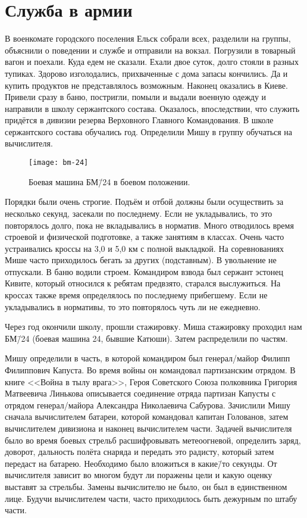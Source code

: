 ﻿\chapter{Служба в армии}
В военкомате городского поселения Ельск собрали всех, разделили на группы, объяснили о поведении и службе и отправили на вокзал. Погрузили в товарный вагон и поехали. Куда едем не сказали. Ехали двое суток, долго стояли в разных тупиках. Здорово изголодались, прихваченные с дома запасы кончились. Да и купить продуктов не представлялось возможным. Наконец оказались в Киеве. Привели сразу в баню, постригли, помыли и выдали военную одежду и направили в школу сержантского состава. Оказалось, впоследствии, что служить придётся в дивизии резерва Верховного Главного Командования. В школе сержантского состава обучались год. Определили Мишу в группу обучаться на вычислителя.

\begin{wrapfigure}{O}{.4\textwidth}
\centering
\texttt{[image: bm-24]}
\caption[Боевая машина БМ\=/24 в боевом положении.]{Боевая машина БМ\=/24 в боевом положении\footnotemark.}
\label{fig:bm-24}
\end{wrapfigure}

Порядки были очень строгие. Подъём и отбой должны были осуществить за несколько секунд, засекали по последнему. Если не укладывались, то это повторялось долго, пока не вкладывались в норматив. Много отводилось время строевой и физической подготовке, а также занятиям в классах. Очень часто устраивались кроссы на 3,0 и 5,0 км с полной выкладкой. На соревнованиях Мише часто приходилось бегать за других (подставным). В увольнение не отпускали. В баню водили строем. Командиром взвода был сержант эстонец Кивите, который относился к ребятам предвзято, старался выслужиться. На кроссах также время определялось по последнему прибегшему. Если не укладывались в нормативы, то это повторялось чуть ли не ежедневно. 

Через год окончили школу, прошли стажировку. Миша стажировку проходил нам БМ\=/24 (боевая машина 24, бывшие Катюши). Затем распределили по частям. 

Мишу определили в часть, в которой командиром был генерал\-/майор Филипп Филиппович Капуста. Во время войны он командовал партизанским отрядом. В книге <<Война в тылу врага>>, Героя Советского Союза полковника Григория Матвеевича Линькова описывается соединение отряда партизан Капусты с отрядом генерал\-/майора Александра Николаевича Сабурова. Зачислили Мишу сначала вычислителем батареи, которой командовал капитан Голованов, затем вычислителем дивизиона и наконец вычислителем части. Задачей вычислителя было во время боевых стрельб расшифровывать метеоогневой, определить заряд, доворот, дальность полёта снаряда и передать это радисту, который затем передаст на батарею. Необходимо было вложиться в какие\=/то секунды. От вычислителя зависит во многом будут ли поражены цели и какую оценку выставят за стрельбы. Замены вычислителю не было, он был в единственном лице. Будучи вычислителем части, часто приходилось быть дежурным по штабу части. 

